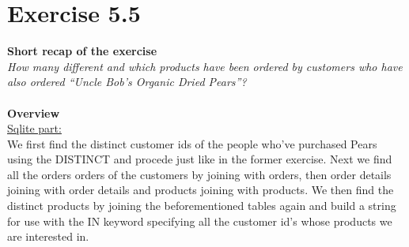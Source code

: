 \documentclass{article}
\begin{document}
\section{Exercise 5.5}
\textbf{Short recap of the exercise}\\
\textit{How many different and which products have been ordered by customers who have also ordered “Uncle Bob’s Organic Dried Pears”?}\\
~\\
\textbf{Overview}\\
\underline{Sqlite part:}~\\
We first find the distinct customer ids of the people who've purchased Pears using the DISTINCT and procede just like in the former exercise.
Next we find all the orders orders of the customers by joining with orders, then order details joining with order details and products joining with products.
We then find the distinct products by joining the beforementioned tables again and
build a string for use with the IN keyword specifying all the customer id's whose products we are interested in.
\end{document}
